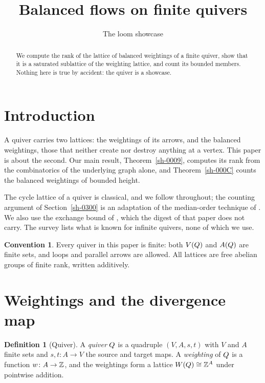 \documentclass[11pt]{amsart}
\title{Balanced flows on finite quivers}
\author{The loom showcase}
\theoremstyle{plain}
\theoremstyle{definition}
\newtheorem{definition}[theorem]{Definition}
\newtheorem{convention}[theorem]{Convention}
\theoremstyle{remark}
\begin{document}
\maketitle

\begin{abstract}
We compute the rank of the lattice of balanced weightings of a finite quiver, show that it is a saturated sublattice of the weighting lattice, and count its bounded members. Nothing here is true by accident: the quiver is a showcase.
\end{abstract}

\section{Introduction}\label{sh-0100}

A quiver carries two lattices: the weightings of its arrows, and the balanced weightings, those that neither create nor destroy anything at a vertex. This paper is about the second. Our main result, Theorem~\ref{sh-0009}, computes its rank from the combinatorics of the underlying graph alone, and Theorem~\ref{sh-000C} counts the balanced weightings of bounded height.

The cycle lattice of a quiver is classical, and we follow \cite[Proposition 2.1]{Arden24} throughout; the counting argument of Section~\ref{sh-0300} is an adaptation of the median-order technique of \cite[Theorem 2.3]{Bellamy19}. We also use the exchange bound of \cite[Lemma 5.9]{Arden24}, which the digest of that paper does not carry. The survey \cite{Cortez07} lists what is known for infinite quivers, none of which we use.

\begin{convention}\label{sh-0001}
Every quiver in this paper is finite: both $V(Q)$ and $A(Q)$ are finite sets, and loops and parallel arrows are allowed. All lattices are free abelian groups of finite rank, written additively.
\end{convention}


\section{Weightings and the divergence map}\label{sh-0200}

\begin{definition}[Quiver]\label{sh-0002}
A \emph{quiver} $Q$ is a quadruple $(V, A, s, t)$ with $V$ and $A$ finite sets and $s, t \colon A \to V$ the source and target maps. A \emph{weighting} of $Q$ is a function $w \colon A \to \mathbb{Z}$, and the weightings form a lattice $W(Q) \cong \mathbb{Z}^{A}$ under pointwise addition.
\end{definition}
\end{document}
